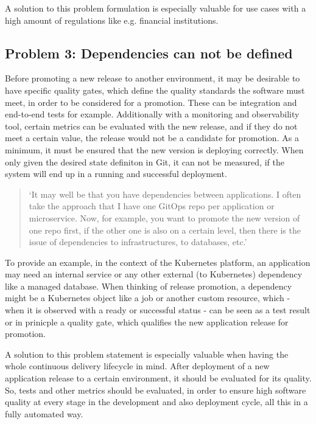 A solution to this problem formulation is especially valuable for
use cases with a high amount of regulations like e.g. financial institutions.

\subsection{Problem 3: Dependencies can not be defined}
\label{problem3}

Before promoting a new release to another environment,
it may be desirable to have specific
quality gates, which define the quality standards the
software must meet, in order to be considered for a promotion.
These can be integration and end-to-end tests for example.
Additionally with a monitoring and observability tool,
certain metrics can be evaluated with the new release,
and if they do not meet a certain value, the release would not
be a candidate for promotion.
As a minimum, it must be ensured that the new version is 
deploying correctly. When only given the desired state definiton
in Git, it can not be measured, if the system will end up in a running
and successful deployment.

\begin{quotation}
	\noindent
	\enquote*{It may well be that you have dependencies between applications. I often take the approach that I have one GitOps repo per application or microservice. Now, for example, you want to promote the new version of one repo first, if the other one is also on a certain level, then there is the issue of dependencies to infrastructures, to databases, etc.}
\end{quotation}

To provide an example, in the context of the Kubernetes platform,
an application may need an internal service or any other external (to Kubernetes)
dependency like a managed database.
When thinking of release promotion,
a dependency might be a Kubernetes object like a job or another custom resource,
which - when it is observed with a ready or successful status -
can be seen as a test result or in prinicple a quality gate, which qualifies the
new application release for promotion.

A solution to this problem statement is especially valuable when having the whole
continuous delivery lifecycle in mind. After deployment of a new application release
to a certain environment, it should be evaluated for its quality. So, tests
and other metrics should be evaluated, in order to ensure high software quality
at every stage in the development and also deployment cycle,
all this in a fully automated way.

